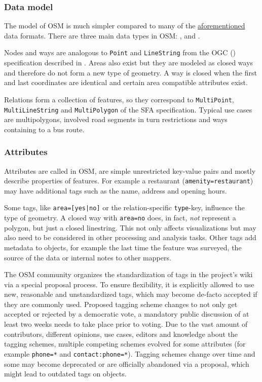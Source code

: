 		\subsubsection{Data model}
		
			The model of OSM is much simpler compared to many of the \hyperref[subsec:file-formats]{aforementioned} data formats.
			There are three main data types in OSM: ,  and \cite{osm-wiki-data-model}.
			
			Nodes and ways are analogous to \texttt{Point} and \texttt{LineString} from the OGC  () specification described in .
			Areas also exist but they are modeled as closed ways and therefore do not form a new type of geometry.
			A way is closed when the first and last coordinates are identical and certain area compatible attributes exist.
			
			Relations form a collection of features, so they correspond to \texttt{MultiPoint}, \texttt{MultiLineString} and \texttt{MultiPolygon} of the SFA specification.
			Typical use cases are multipolygons, involved road segments in turn restrictions and ways containing to a bus route.
			
		\subsubsection{Attributes}
		\label{subsubsec:osm-attributes}
			
			Attributes are called  in OSM, are simple unrestricted key-value pairs and mostly describe properties of features.
			For example a restaurant (\texttt{amenity=restaurant}) may have additional tags such as the name, address and opening hours.
			
			Some tags, like \texttt{area=[yes|no]} or the relation-specific \texttt{type}-key, influence the type of geometry.
			A closed way with \texttt{area=no} does, in fact, \textit{not} represent a polygon, but just a closed linestring.
			This not only affects visualizations but may also need to be considered in other processing and analysis tasks.
			Other tags add metadata to objects, for example the last time the feature was surveyed, the source of the data or internal notes to other mappers.
			
			The OSM community organizes the standardization of tags in the project's wiki via a special proposal process\cite{osm-wiki-proposal-process}.
			To ensure flexibility, it is explicitly allowed to use new, reasonable and unstandardized tags, which may become de-facto accepted if they are commonly used.
			Proposed tagging scheme changes to not only get accepted or rejected by a democratic vote, a mandatory public discussion of at least two weeks needs to take place prior to voting.
			Due to the vast amount of contributors, different opinions, use cases, editors and knowledge about the tagging schemes, multiple competing schemes evolved for some attributes (for example \texttt{phone=*} and \texttt{contact:phone=*}).
			Tagging schemes change over time and some may become deprecated or are officially abandoned via a proposal, which might lead to outdated tags on objects.
			
